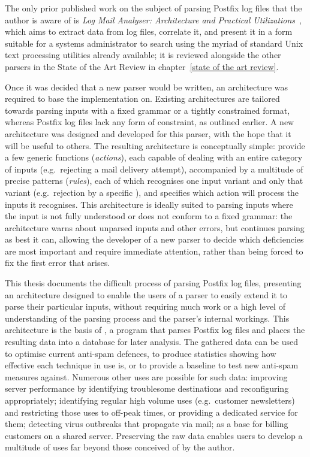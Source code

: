 The only prior published work on the subject of parsing Postfix log files
that the author is aware of is \textit{Log Mail Analyser: Architecture and
Practical Utilizations\/}~\cite{log-mail-analyser}, which aims to extract
data from log files, correlate it, and present it in a form suitable for a
systems administrator to search using the myriad of standard Unix text
processing utilities already available; it is reviewed alongside the other
parsers in the State of the Art Review in chapter~\ref{state of the art
review}.

Once it was decided that a new parser would be written, an architecture was
required to base the implementation on.  Existing architectures are
tailored towards parsing inputs with a fixed grammar or a tightly
constrained format, whereas Postfix log files lack any form of constraint,
as outlined earlier.  A new architecture was designed and developed for
this parser, with the hope that it will be useful to others.  The resulting
architecture is conceptually simple: provide a few generic functions
(\textit{actions\/}), each capable of dealing with an entire category of
inputs (e.g.\ rejecting a mail delivery attempt), accompanied by a
multitude of precise patterns (\textit{rules\/}), each of which recognises
one input variant and only that variant (e.g.\ rejection by a specific
), and specifies which action will process the inputs it
recognises.  This architecture is ideally suited to parsing inputs
where the input is not fully understood or does not conform to a fixed
grammar: the architecture warns about unparsed inputs and other errors, but
continues parsing as best it can, allowing the developer of a new parser to
decide which deficiencies are most important and require immediate
attention, rather than being forced to fix the first error that arises.

This thesis documents the difficult process of parsing Postfix log files,
presenting an architecture designed to enable the users of a parser to
easily extend it to parse their particular inputs, without requiring much
work or a high level of understanding of the parsing process and the
parser's internal workings.  This architecture is the basis of
\parsername{}, a program that parses Postfix log files and places the
resulting data into a database for later analysis.  The gathered data can
be used to optimise current anti-spam defences, to produce statistics
showing how effective each technique in use is, or to provide a baseline to
test new anti-spam measures against.  Numerous other uses are possible for
such data: improving server performance by identifying troublesome
destinations and reconfiguring appropriately; identifying regular high
volume uses (e.g.\ customer newsletters) and restricting those uses to
off-peak times, or providing a dedicated service for them; detecting virus
outbreaks that propagate via mail; as a base for billing customers on a
shared server.  Preserving the raw data enables users to develop a
multitude of uses far beyond those conceived of by the author.

